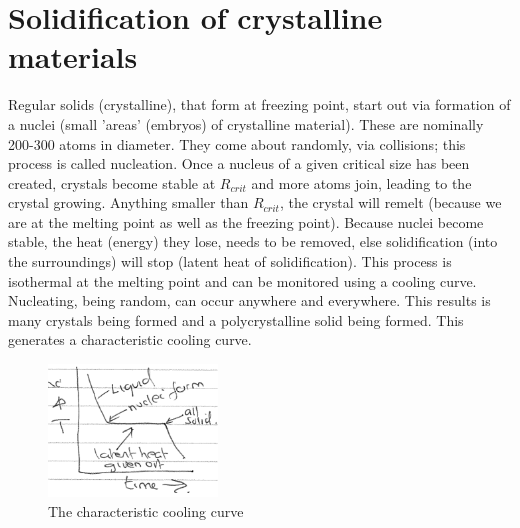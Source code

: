 \documentclass[class=report, crop=false, 12pt,a4paper]{standalone}
\begin{document}
\section{Solidification of crystalline materials}
Regular solids (crystalline), that form at freezing point, start out via formation of a nuclei (small 'areas' (embryos) of crystalline material). These are nominally 200-300 atoms in diameter. They come about randomly, via collisions; this process is called nucleation. Once a nucleus of a given critical size has been created, crystals become stable at $R_{crit}$ and more atoms join, leading to the crystal growing. Anything smaller than $R_{crit}$, the crystal will remelt (because we are at the melting point as well as the freezing point). Because nuclei become stable, the heat (energy) they lose, needs to be removed, else solidification (into the surroundings) will stop (latent heat of solidification). This process is isothermal at the melting point and can be monitored using a cooling curve. Nucleating, being random, can occur anywhere and everywhere. This results is many crystals being formed and a polycrystalline solid being formed. This generates a characteristic cooling curve.
\begin{figure}
  \centering
  \includegraphics[width = 0.4\textwidth]{../img/coolingcurve}
  \caption{The characteristic cooling curve}
  \label{fig:coolingcurve}
\end{figure}
\end{document}
